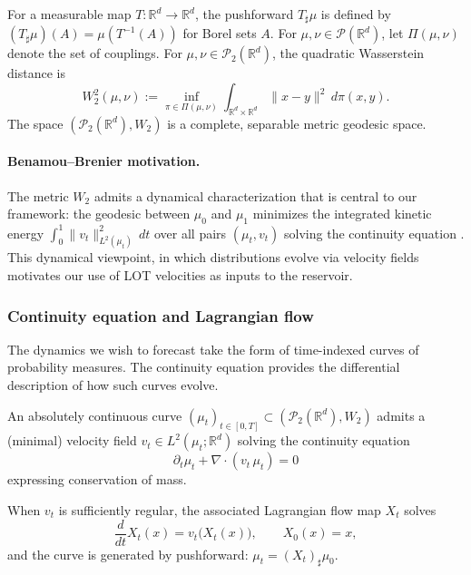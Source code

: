 \documentclass[11pt]{article}
\newcommand{\R}{\mathbb{R}}
\newcommand{\1}{\mathbf{1}}
\begin{document}
For a measurable map $T:\R^d\to\R^d$, the pushforward $T_\sharp\mu$ is defined by $(T_\sharp\mu)(A)=\mu(T^{-1}(A))$ for Borel sets $A$. For $\mu,\nu\in\mathcal{P}(\R^d)$, let $\Pi(\mu,\nu)$ denote the set of couplings.   For $\mu,\nu\in\mathcal{P}_2(\R^d)$, the quadratic Wasserstein distance is
\begin{equation}\label{eq:W2}
W_2^2(\mu,\nu)
:=\inf_{\pi\in\Pi(\mu,\nu)}\int_{\R^d\times\R^d}\|x-y\|^2\,d\pi(x,y).
\end{equation}
The space $(\mathcal{P}_2(\R^d),W_2)$ is a complete, separable metric geodesic space. 

\paragraph{Benamou--Brenier motivation.}
The metric $W_2$ admits a dynamical characterization that is central to our framework: the geodesic between $\mu_0$ and $\mu_1$ minimizes the integrated kinetic energy $\int_0^1\|v_t\|_{L^2(\mu_t)}^2\,dt$ over all pairs $(\mu_t,v_t)$ solving the continuity equation \cite{benamou2000computational}. This dynamical viewpoint, in which distributions evolve via velocity fields motivates our use of LOT velocities as inputs to the reservoir.

\subsubsection*{Continuity equation and Lagrangian flow}\label{sec:prelim-continuity}

The dynamics we wish to forecast take the form of time-indexed curves of probability measures. The continuity equation provides the differential description of how such curves evolve.

An absolutely continuous curve $(\mu_t)_{t\in[0,T]}\subset(\mathcal{P}_2(\R^d),W_2)$ admits a (minimal) velocity field $v_t\in L^2(\mu_t;\R^d)$ solving the continuity equation
\begin{equation}\label{eq:continuity}
\partial_t \mu_t + \nabla\cdot(v_t\,\mu_t)=0
\end{equation}
expressing conservation of mass. 

When $v_t$ is sufficiently regular, the associated Lagrangian flow map $X_t$ solves
\begin{equation}\label{eq:flow-map}
\frac{d}{dt}X_t(x)=v_t\bigl(X_t(x)\bigr),\qquad X_0(x)=x,
\end{equation}
and the curve is generated by pushforward: $\mu_t=(X_t)_\sharp\mu_0$.
\end{document}
